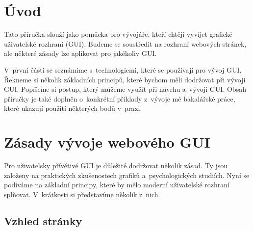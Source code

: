 \section{Úvod}
\label{chap:introduction}

Tato příručka slouží jako pomůcka pro vývojáře, kteří chtějí vyvíjet grafické uživatelské rozhraní (GUI). Budeme se soustředit na rozhraní webových stránek, ale některé zásady lze aplikovat pro jakékoliv GUI.

V~první části se seznámíme s~technologiemi, které se používají pro vývoj GUI. Řekneme si několik základních principů, které bychom měli dodržovat při vývoji GUI. Popíšeme si postup, který můžeme využít při návrhu a~vývoji GUI. Obsah příručky je také doplněn o~konkrétní příklady z~vývoje mé bakalářské práce, které ukazují použití některých bodů v~praxi.

\section{Zásady vývoje webového GUI}
\label{sec:principles}

Pro uživatelsky přívětivé GUI je důležité dodržovat několik zásad. Ty jsou založeny na praktických zkušenostech grafiků a~psychologických studiích. Nyní se podíváme na základní principy, které by mělo moderní uživatelské rozhraní splňovat. V~krátkosti si představíme několik z~nich.

\subsection{Vzhled stránky}
\label{subsec:visual-principles}

